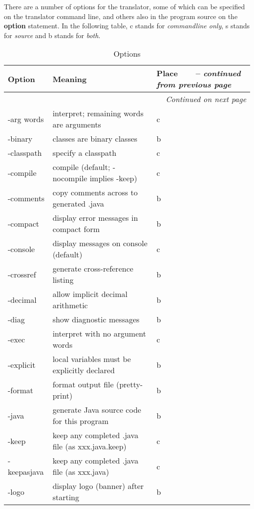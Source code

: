 There are a number of options for the translator, some of which can be specified on the translator command line, and others also in the program source on the \textbf{option} statement. In the following table, c stands for \emph{commandline only}, s stands for \emph{source} and b stands for \emph{both}.
\begin{longtable}[l]{|l|p{10cm}|l|}
\caption{ Options } \\
\hline
\rowcolor[gray]{0.8} \bfseries Option & \bfseries Meaning & \bfseries Place   \
\endfirsthead
\multicolumn{3}{r}%
{{\tablename\ \thetable{} -- \emph{continued from previous page}}} \\
\endhead
\hline \multicolumn{3}{r}{\emph{Continued on next page}}
\endfoot

\endlastfoot
\rowcolor[gray]{0.8} \bfseries \huge   & \normalsize  &  \\
\hline
-arg words & interpret; remaining words are arguments & c \\
\hline
-binary &  classes are binary classes & b \\
\hline
 -classpath  & specify a classpath & c \\
\hline
 -compile  & compile (default; -nocompile implies -keep) & c \\
\hline
 -comments     & copy comments across to generated .java &b \\
\hline
 -compact      & display error messages in compact form &b \\
\hline
 -console   & display messages on console (default) &c \\
\hline
 -crossref     & generate cross-reference listing &b \\
\hline
 -decimal      & allow implicit decimal arithmetic &b \\
\hline
 -diag         & show diagnostic messages &b \\
\hline
 -exec        & interpret with no argument words &c \\
\hline
-explicit     & local variables must be explicitly declared &b \\
\hline
-format       & format output file (pretty-print) &b \\
\hline
-java         & generate Java source code for this program &b \\
\hline
 -keep         & keep any completed .java file (as xxx.java.keep) &c \\
\hline
-keepasjava   & keep any completed .java file (as xxx.java) &c \\
\hline
 -logo         & display logo (banner) after starting &b \\

\end{longtable}
